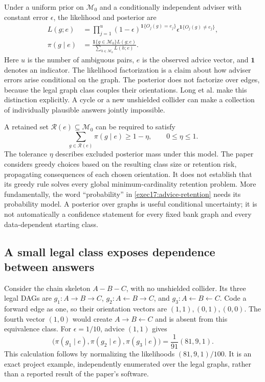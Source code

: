 Under a uniform prior on $\mathcal M_0$ and a conditionally independent adviser
with constant error $\epsilon$, the likelihood and posterior are
\begin{equation}
\begin{split}
 L(g;e)&=\prod_{j=1}^{u}(1-\epsilon)^{\mathbf 1\{O_j(g)=e_j\}}
                   \epsilon^{\mathbf 1\{O_j(g)\ne e_j\}},\\
 \pi(g\mid e)&=\frac{\mathbf 1\{g\in\mathcal M_0\}L(g;e)}
                        {\sum_{h\in\mathcal M_0}L(h;e)}.
\end{split}
\label{exec17:advice-posterior}
\end{equation}
Here $u$ is the number of ambiguous pairs, $e$ is the observed advice vector,
and $\mathbf 1$ denotes an indicator. The likelihood factorization is a claim
about how adviser errors arise conditional on the graph. The posterior does
not factorize over edges, because the legal graph class couples their
orientations. Long et al. make this distinction explicitly. A cycle or a new
unshielded collider can make a collection of individually plausible answers
jointly impossible.~\citep{exec17_imperfect_experts}

A retained set $\mathcal R(e)\subseteq\mathcal M_0$ can be required to satisfy
\begin{equation}
 \sum_{g\in\mathcal R(e)}\pi(g\mid e)\geq 1-\eta,
 \qquad 0\leq\eta\leq1.
\label{exec17:advice-retention}
\end{equation}
The tolerance $\eta$ describes excluded posterior mass under this model.
The paper considers greedy choices based on the resulting class size or
retention risk, propagating consequences of each chosen orientation. It does
not establish that its greedy rule solves every global minimum-cardinality
retention problem. More fundamentally, the word ``probability'' in
\eqref{exec17:advice-retention} needs its probability model. A posterior over
graphs is useful conditional uncertainty; it is not automatically a
confidence statement for every fixed bank graph and every data-dependent
starting class.

\subsection{A small legal class exposes dependence between answers}

Consider the chain skeleton $A-B-C$, with no unshielded collider. Its three
legal DAGs are $g_1:A\to B\to C$, $g_2:A\leftarrow B\to C$, and
$g_3:A\leftarrow B\leftarrow C$. Code a forward edge as one, so their
orientation vectors are $(1,1),(0,1),(0,0)$. The fourth vector $(1,0)$ would
create $A\to B\leftarrow C$ and is absent from this equivalence class.
For $\epsilon=1/10$, advice $(1,1)$ gives
\begin{equation}
 \bigl(\pi(g_1\mid e),\pi(g_2\mid e),\pi(g_3\mid e)\bigr)
       =\frac{1}{91}(81,9,1).
\label{exec17:advice-chain}
\end{equation}
This calculation follows by normalizing the likelihoods
$(81,9,1)/100$. It is an exact project example, independently enumerated over
the legal graphs, rather than a reported result of the paper's software.
\citep{exec17_advice_validity_exact}

